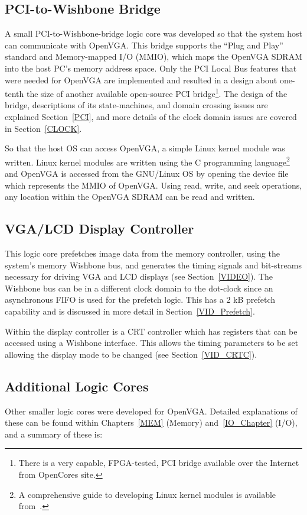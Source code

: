 \subsection{PCI-to-Wishbone Bridge}
\label{OPENVGA_PCI}
A small PCI-to-Wishbone-bridge logic core was developed so that the system host
can communicate with OpenVGA. This bridge supports the ``Plug and Play'' standard
and Memory-mapped I/O (MMIO), which maps the OpenVGA SDRAM into the host PC's memory
address space. Only the PCI Local Bus features that were needed for OpenVGA are
implemented and resulted in a design about one-tenth the size of another
available open-source PCI bridge\footnote{There is a very capable, FPGA-tested,
PCI bridge available over the Internet from OpenCores site.}. The design of the
bridge, descriptions of its state-machines, and domain crossing issues are
explained Section~\ref{PCI}, and more details of the clock domain issues are
covered in Section~\ref{CLOCK}.

So that the host OS can access OpenVGA, a simple Linux kernel module was written.
Linux kernel modules are written using the C programming language\footnote{A
comprehensive guide to developing Linux kernel modules is available
from~\cite{salzman:lkm}.} and OpenVGA is accessed from the GNU/Linux OS by
opening the device file which represents the MMIO of OpenVGA. Using read, write,
and seek operations, any location within the OpenVGA SDRAM can be read and
written.


\subsection{VGA/LCD Display Controller}
This logic core prefetches image data from the memory controller, using the
system's memory Wishbone bus, and generates the timing signals and bit-streams
necessary for driving VGA and LCD displays (see Section~\ref{VIDEO}). The
Wishbone bus can be in a different clock domain to the dot-clock since an
asynchronous FIFO is used for the prefetch logic. This has a 2 kB prefetch
capability and is discussed in more detail in Section~\ref{VID_Prefetch}.

Within the display controller is a CRT controller which has registers that can be
accessed using a Wishbone interface. This allows the timing parameters to be set
allowing the display mode to be changed (see Section~\ref{VID_CRTC}).


\subsection{Additional Logic Cores}
Other smaller logic cores were developed for OpenVGA. Detailed explanations of
these can be found within Chapters~\ref{MEM} (Memory) and~\ref{IO_Chapter}
(I/O), and a summary of these is:

